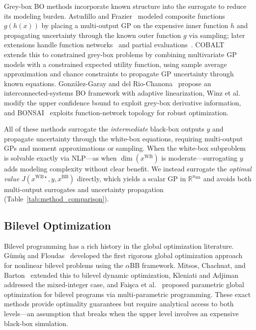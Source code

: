 \documentclass[12pt,a4paper]{article}%
\theoremstyle{plain}%
\theoremstyle{remark}%
\theoremstyle{definition}%
\def\WB{\mathrm{WB}}
\def\BB{\mathrm{BB}}
\begin{document}
Grey-box BO methods incorporate known structure into the surrogate to reduce its modeling burden. Astudillo and Frazier~\cite{astudillo2019bocf} modeled composite functions $g(h(x))$ by placing a multi-output GP on the expensive inner function $h$ and propagating uncertainty through the known outer function $g$ via sampling; later extensions handle function networks~\cite{astudillo2021bofn} and partial evaluations~\cite{buathong2024partial}. COBALT~\cite{paulson2022cobalt} extends this to constrained grey-box problems by combining multivariate GP models with a constrained expected utility function, using sample average approximation and chance constraints to propagate GP uncertainty through known equations. Gonz\'{a}lez-Garay and del Rio-Chanona~\cite{gonzalez2025bois} propose an interconnected-systems BO framework with adaptive linearization, Winz et al.~\cite{winz2025greybox} modify the upper confidence bound to exploit grey-box derivative information, and BONSAI~\cite{kudva2026bonsai} exploits function-network topology for robust optimization.

All of these methods surrogate the \emph{intermediate} black-box outputs $y$ and propagate uncertainty through the white-box equations, requiring multi-output GPs and moment approximations or sampling. When the white-box subproblem is solvable exactly via NLP---as when $\dim(x^{\WB})$ is moderate---surrogating $y$ adds modeling complexity without clear benefit. We instead surrogate the \emph{optimal value} $J(x^{\WB\star}, y, x^{\BB})$ directly, which yields a scalar GP in $\mathbb{R}^{n_{\BB}}$ and avoids both multi-output surrogates and uncertainty propagation (Table~\ref{tab:method_comparison}).

\subsection{Bilevel Optimization}

Bilevel programming has a rich history in the global optimization literature. G\"{u}m\"{u}\c{s} and Floudas~\cite{gumus2001bilevel} developed the first rigorous global optimization approach for nonlinear bilevel problems using the $\alpha$BB framework. Mitsos, Chachuat, and Barton~\cite{mitsos2009bilevel_dynamic} extended this to bilevel dynamic optimization, Kleniati and Adjiman~\cite{kleniati2014bilevel} addressed the mixed-integer case, and Fai\c{s}ca et al.~\cite{faisca2007bilevel} proposed parametric global optimization for bilevel programs via multi-parametric programming. These exact methods provide optimality guarantees but require analytical access to both levels---an assumption that breaks when the upper level involves an expensive black-box simulation.
\end{document}
